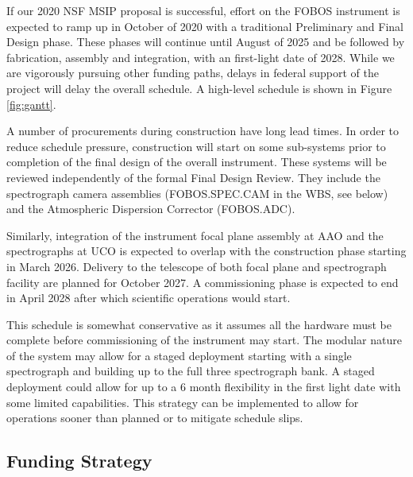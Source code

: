 \documentclass[oneside,11pt]{amsart}
\begin{document}
If our 2020 NSF MSIP proposal is successful, effort on the FOBOS instrument is expected to ramp up in October of 2020
with a  traditional Preliminary and Final Design phase.  These phases will continue until August of 2025 and be
followed by fabrication, assembly and integration, with an first-light date of 2028.  While we are vigorously pursuing
other funding paths, delays in federal support of the project will delay the overall schedule.  
A high-level schedule is shown in Figure \ref{fig:gantt}.  

A number of procurements during construction have long lead times.  In order to reduce schedule pressure, construction will start on some sub-systems prior to completion of the final design of the overall instrument.  These
systems will be reviewed independently of the formal Final Design Review.  They include the spectrograph camera
assemblies (FOBOS.SPEC.CAM in the WBS, see below) and the Atmospheric Dispersion Corrector (FOBOS.ADC).

Similarly, integration of the instrument focal plane assembly at AAO and the spectrographs at UCO is expected to
overlap with the construction phase starting in March 2026.  Delivery to the telescope of both focal plane and
spectrograph facility are planned for October 2027.  A commissioning phase is expected to end in April 2028 after which
scientific operations would start.

This schedule is somewhat conservative as it assumes all the hardware must be complete before commissioning of the
instrument may start.  The modular nature of the system may allow for a staged deployment starting with a single
spectrograph and building up to the full three spectrograph bank.  A staged deployment could allow for up to a 6 month
flexibility in the first light date with some limited capabilities.  This strategy can be implemented to allow for
operations sooner than planned or to mitigate schedule slips.



\subsection{Funding Strategy}
\end{document}

